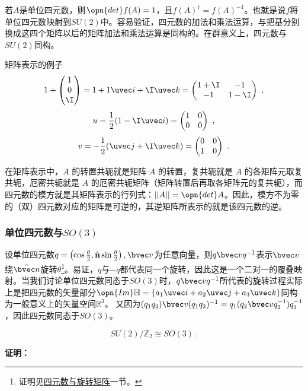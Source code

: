 若$A$是单位四元数，则$\opn{det}f(A)=1$，且$f(A)^{\dagger}=f(A)^{-1}$。也就是说$f$将单位四元数映射到$SU(2)$中。容易验证，四元数的加法和乘法运算，与把基分别换成这四个矩阵以后的矩阵加法和乘法运算是同构的。在群意义上，四元数与$SU(2)$同构。

\begin{example}{矩阵表示的例子}\label{ex_Quat_1}
\begin{equation}
1+\begin{pmatrix}1\\0\\\I\end{pmatrix} =1+1\uvec i+\I\uvec k =\begin{pmatrix}1+\I&-1\\-1&1-\I\end{pmatrix} ~,
\end{equation}
\begin{equation}
u=\frac{1}{2}(1-\I\uvec i)=\begin{pmatrix}1&0\\0&0\end{pmatrix} ~,
\end{equation}
\begin{equation}
v=-\frac{1}{2}(\uvec j+\I\uvec k)=\begin{pmatrix}0&0\\1&0\end{pmatrix} ~.
\end{equation}
\end{example}

在矩阵表示中，$A$ 的转置共轭就是矩阵 $A$ 的转置，复共轭就是 $A$ 的各矩阵元取复共轭，厄密共轭就是 $A$ 的厄密共轭矩阵（矩阵转置后再取各矩阵元的复共轭），而四元数的模方就是其矩阵表示的行列式：$||A||=\opn{det}A$。因此，模方不为零的（双）四元数对应的矩阵是可逆的，其逆矩阵所表示的就是该四元数的逆。
\subsubsection{单位四元数与$SO(3)$}
设单位四元数$q=\left(\cos\frac{\theta}{2},\hat{\mathbf{n}}\sin\frac{\theta}{2}\right),\bvec v$为任意向量，则$q\bvec vq^{-1}$表示$\bvec v$绕$\hat {\bvec n}$旋转$\theta$\footnote{证明见\href{https://wuli.wiki/online/QuatN.html}{四元数与旋转矩阵}一节。}。易证，$q$与$-q$都代表同一个旋转，因此这是一个二对一的覆叠映射。当我们讨论单位四元数同态于$SO(3)$时，$q\bvec v q^{-1}$所代表的旋转过程实际上是把四元数的矢量部分$\opn{Im}\mathbb H=\{a_1\uvec i+a_2\uvec j+ a_3\uvec k\}$同构为一般意义上的矢量空间$\mathbb R^3$。
又因为$(q_1q_2)\bvec v (q_1q_2)^{-1}=q_1(q_2\bvec v q_2^{-1})q_1^{-1}$，因此四元数同态于$SO(3)$。
\begin{corollary}{}

\begin{equation}
SU(2)/\mathbb{Z}_2\cong SO(3)~.
\end{equation}
\end{corollary}
\textbf{证明：}

